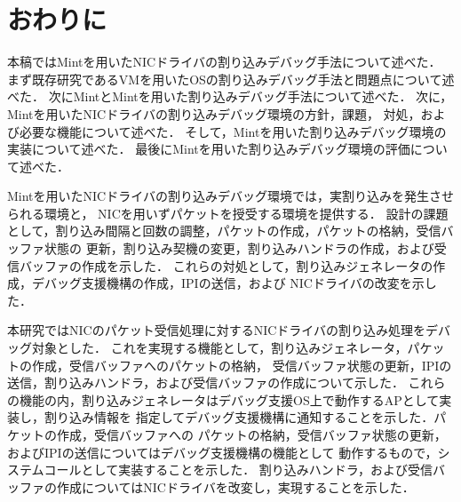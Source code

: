 \documentclass[submit,techreq,noauthor,dvipdfmx]{ipsj}
\begin{document}
\section{おわりに}\label{chap:conclusion}

本稿ではMintを用いたNICドライバの割り込みデバッグ手法について述べた．
まず既存研究であるVMを用いたOSの割り込みデバッグ手法と問題点について述べた．
次にMintとMintを用いた割り込みデバッグ手法について述べた．
次に，Mintを用いたNICドライバの割り込みデバッグ環境の方針，課題，
対処，および必要な機能について述べた．
そして，Mintを用いた割り込みデバッグ環境の実装について述べた．
最後にMintを用いた割り込みデバッグ環境の評価について述べた．

Mintを用いたNICドライバの割り込みデバッグ環境では，実割り込みを発生させられる環境と，
NICを用いずパケットを授受する環境を提供する．
設計の課題として，割り込み間隔と回数の調整，パケットの作成，パケットの格納，受信バッファ状態の
更新，割り込み契機の変更，割り込みハンドラの作成，および受信バッファの作成を示した．
これらの対処として，割り込みジェネレータの作成，デバッグ支援機構の作成，IPIの送信，および
NICドライバの改変を示した．

本研究ではNICのパケット受信処理に対するNICドライバの割り込み処理をデバッグ対象とした．
これを実現する機能として，割り込みジェネレータ，パケットの作成，受信バッファへのパケットの格納，
受信バッファ状態の更新，IPIの送信，割り込みハンドラ，および受信バッファの作成について示した．
これらの機能の内，割り込みジェネレータはデバッグ支援OS上で動作するAPとして実装し，割り込み情報を
指定してデバッグ支援機構に通知することを示した．パケットの作成，受信バッファへの
パケットの格納，受信バッファ状態の更新，およびIPIの送信についてはデバッグ支援機構の機能として
動作するもので，システムコールとして実装することを示した．
割り込みハンドラ，および受信バッファの作成についてはNICドライバを改変し，実現することを示した．


\end{document}
